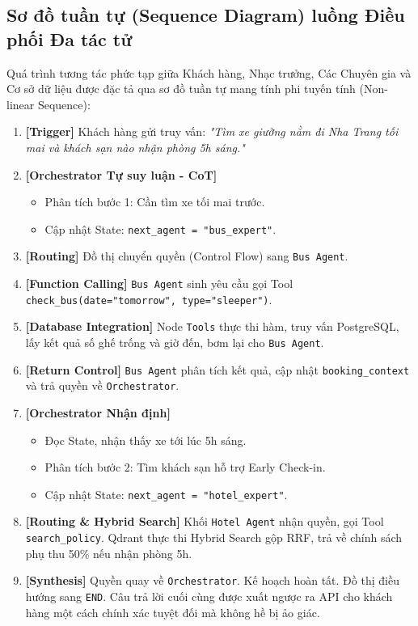 \subsection{Sơ đồ tuần tự (Sequence Diagram) luồng Điều phối Đa tác tử}

Quá trình tương tác phức tạp giữa Khách hàng, Nhạc trưởng, Các Chuyên gia và Cơ sở dữ liệu được đặc tả qua sơ đồ tuần tự mang tính phi tuyến tính (Non-linear Sequence):

\begin{enumerate}
    \item \textbf{[Trigger]} Khách hàng gửi truy vấn: \textit{"Tìm xe giường nằm đi Nha Trang tối mai và khách sạn nào nhận phòng 5h sáng."}
    \item \textbf{[Orchestrator Tự suy luận - CoT]} 
    \begin{itemize}
        \item Phân tích bước 1: Cần tìm xe tối mai trước.
        \item Cập nhật State: \texttt{next\_agent = "bus\_expert"}.
    \end{itemize}
    \item \textbf{[Routing]} Đồ thị chuyển quyền (Control Flow) sang \texttt{Bus Agent}.
    \item \textbf{[Function Calling]} \texttt{Bus Agent} sinh yêu cầu gọi Tool \texttt{check\_bus(date="tomorrow", type="sleeper")}.
    \item \textbf{[Database Integration]} Node \texttt{Tools} thực thi hàm, truy vấn PostgreSQL, lấy kết quả số ghế trống và giờ đến, bơm lại cho \texttt{Bus Agent}.
    \item \textbf{[Return Control]} \texttt{Bus Agent} phân tích kết quả, cập nhật \texttt{booking\_context} và trả quyền về \texttt{Orchestrator}.
    \item \textbf{[Orchestrator Nhận định]}
    \begin{itemize}
        \item Đọc State, nhận thấy xe tới lúc 5h sáng.
        \item Phân tích bước 2: Tìm khách sạn hỗ trợ Early Check-in.
        \item Cập nhật State: \texttt{next\_agent = "hotel\_expert"}.
    \end{itemize}
    \item \textbf{[Routing \& Hybrid Search]} Khối \texttt{Hotel Agent} nhận quyền, gọi Tool \texttt{search\_policy}. Qdrant thực thi Hybrid Search gộp RRF, trả về chính sách phụ thu 50\% nếu nhận phòng 5h.
    \item \textbf{[Synthesis]} Quyền quay về \texttt{Orchestrator}. Kế hoạch hoàn tất. Đồ thị điều hướng sang \texttt{END}. Câu trả lời cuối cùng được xuất ngược ra API cho khách hàng một cách chính xác tuyệt đối mà không hề bị ảo giác.
\end{enumerate}
